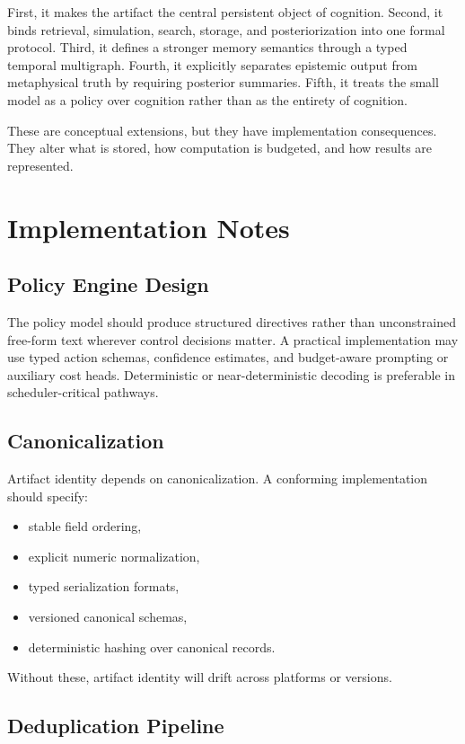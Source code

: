 \documentclass[11pt]{article}
\theoremstyle{definition}
\begin{document}
First, it makes the artifact the central persistent object of cognition. Second, it binds retrieval, simulation, search, storage, and posteriorization into one formal protocol. Third, it defines a stronger memory semantics through a typed temporal multigraph. Fourth, it explicitly separates epistemic output from metaphysical truth by requiring posterior summaries. Fifth, it treats the small model as a policy over cognition rather than as the entirety of cognition.

These are conceptual extensions, but they have implementation consequences. They alter what is stored, how computation is budgeted, and how results are represented.

\section{Implementation Notes}

\subsection{Policy Engine Design}

The policy model should produce structured directives rather than unconstrained free-form text wherever control decisions matter. A practical implementation may use typed action schemas, confidence estimates, and budget-aware prompting or auxiliary cost heads. Deterministic or near-deterministic decoding is preferable in scheduler-critical pathways.

\subsection{Canonicalization}

Artifact identity depends on canonicalization. A conforming implementation should specify:
\begin{itemize}[leftmargin=1.5em]
    \item stable field ordering,
    \item explicit numeric normalization,
    \item typed serialization formats,
    \item versioned canonical schemas,
    \item deterministic hashing over canonical records.
\end{itemize}

Without these, artifact identity will drift across platforms or versions.

\subsection{Deduplication Pipeline}
\end{document}
